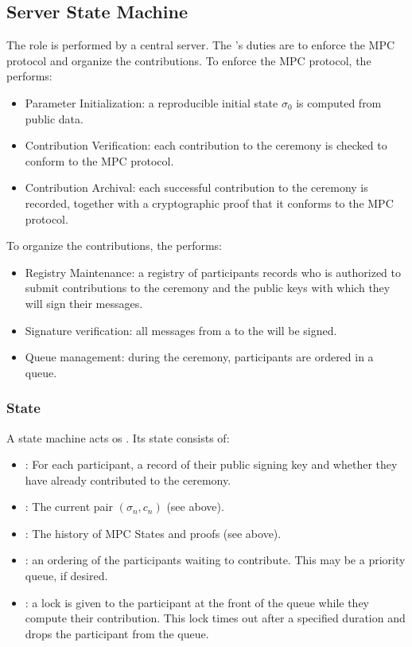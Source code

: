 \subsection{Server State Machine}

The \Coordinator{} role is performed by a central server. The \Coordinator{}'s duties are to enforce the MPC protocol and organize the contributions. To enforce the MPC protocol, the \Coordinator{} performs:
\begin{itemize}
    \item Parameter Initialization: a reproducible initial state $\sigma_0$ is computed from public data.
    \item Contribution Verification: each contribution to the ceremony is checked to conform to the MPC protocol.
    \item Contribution Archival: each successful contribution to the ceremony is recorded, together with a cryptographic proof that it conforms to the MPC protocol.
\end{itemize}
To organize the contributions, the \Coordinator{} performs:
\begin{itemize}
    \item Registry Maintenance: a registry of participants records who is authorized to submit contributions to the ceremony and the public keys with which they will sign their messages.
    \item Signature verification: all messages from a \Contributor{} to the \Coordinator{} will be signed.
    \item Queue management: during the ceremony, participants are ordered in a queue.
\end{itemize}

\subsubsection*{State}
A state machine acts os \Coordinator{}. Its state consists of:
\begin{itemize}
    \item \Registry{}: For each participant, a record of their public signing key and whether they have already contributed to the ceremony.
    \item \MpcState{}: The current pair $(\sigma_n, c_n)$ (see above). 
    \item \Transcript{}: The history of MPC States and proofs (see above).
    \item \Queue{}: an ordering of the participants waiting to contribute. This may be a priority queue, if desired.
    \item \TimedLock{}: a lock is given to the participant at the front of the queue while they compute their contribution. This lock times out after a specified duration and drops the participant from the queue.
\end{itemize}

